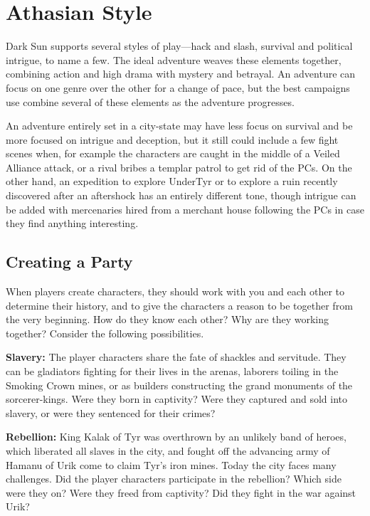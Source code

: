 \section{Athasian Style}
{\tableheader Dark Sun} supports several styles of play---hack and slash, survival and political intrigue, to name a few. The ideal adventure weaves these elements together, combining action and high drama with mystery and betrayal. An adventure can focus on one genre over the other for a change of pace, but the best campaigns use combine several of these elements as the adventure progresses.

An adventure entirely set in a city-state may have less focus on survival and be more focused on intrigue and deception, but it still could include a few fight scenes when, for example the characters are caught in the middle of a Veiled Alliance attack, or a rival bribes a templar patrol to get rid of the PCs. On the other hand, an expedition to explore UnderTyr or to explore a ruin recently discovered after an aftershock has an entirely different tone, though intrigue can be added with mercenaries hired from a merchant house following the PCs in case they find anything interesting.



\subsection{Creating a Party}
When players create characters, they should work with you and each other to determine their history, and to give the characters a reason to be together from the very beginning. How do they know each other? Why are they working together? Consider the following possibilities.

\textbf{Slavery:} The player characters share the fate of shackles and servitude. They can be gladiators fighting for their lives in the arenas, laborers toiling in the Smoking Crown mines, or as builders constructing the grand monuments of the sorcerer-kings. Were they born in captivity? Were they captured and sold into slavery, or were they sentenced for their crimes?

\textbf{Rebellion:} King Kalak of Tyr was overthrown by an unlikely band of heroes, which liberated all slaves in the city, and fought off the advancing army of Hamanu of Urik come to claim Tyr's iron mines. Today the city faces many challenges. Did the player characters participate in the rebellion? Which side were they on? Were they freed from captivity? Did they fight in the war against Urik?

